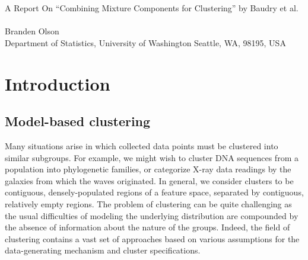 \documentclass{uwstat572}
\renewcommand\;{\,}
\begin{document}

\begin{center}
  {\LARGE A Report On ``Combining Mixture Components for Clustering'' by Baudry et al.}\\\ \\
  {Branden Olson\\ 
    Department of Statistics, University of Washington Seattle, WA, 98195, USA
  }
\end{center}



\begin{abstract}
Model-based clustering typically assumes an underlying Gaussian mixture model in which the number of mixture components is unknown. 
The familiar Bayesian information criterion excels at inferring the number of components when the Gaussian approximation holds.
However, the presence of non-Gaussian groups violates the assumption that each component represents its own cluster, leading to an overestimation of the number of groups.
A modification known as the integrated complete likelihood criterion penalizes model entropy to more accurately infer the number of groups, but can also misconstrue non-Gaussian groups as Gaussian and underestimate the number of components.
\citet{Baudry10} resolve this dilemma by starting with the BIC solution and iteratively merging components to minimize entropy.
This technique produces clusters that are Gaussian mixtures themselves, allowing the number of groups and mixture components to differ.
The result is a hierarchical sequence of clusterings from which the modeler can choose a preferred representative based on various criteria.
In this report we reproduce their results, including several simulation studies as well as flow cytometry data, and demonstrate competitive performance in each case.
\end{abstract}

\section{Introduction}

\subsection{Model-based clustering}
Many situations arise in which collected data points must be clustered into similar subgroups. 
For example, we might wish to cluster DNA sequences from a population into phylogenetic families, or categorize X-ray data readings by the galaxies from which the waves originated.
In general, we consider clusters to be contiguous, densely-populated regions of a feature space, separated by contiguous, relatively empty regions.
The problem of clustering can be quite challenging as the usual difficulties of modeling the underlying distribution are compounded by the absence of information about the nature of the groups.
Indeed, the field of clustering contains a vast set of approaches based on various assumptions for the data-generating mechanism and cluster specifications.
\end{document}
